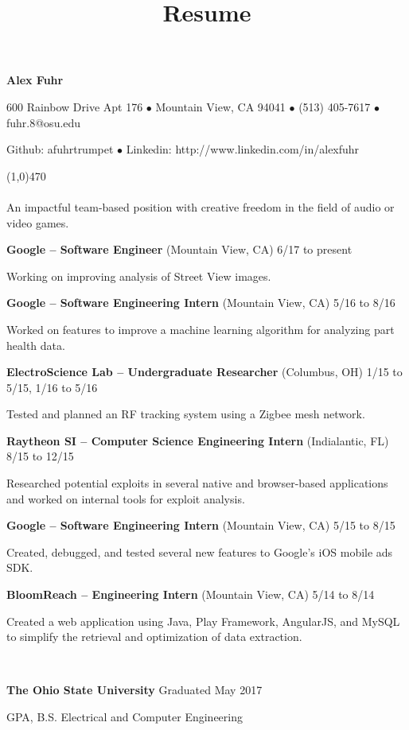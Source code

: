 \documentclass[10pt]{article}
\title{Resume}
\begin{document}
\centerline{{\LARGE \bf Alex Fuhr}}
\centerline{600 Rainbow Drive Apt 176 $\bullet$ Mountain View, CA 94041 $\bullet$ (513) 405-7617 $\bullet$ fuhr.8@osu.edu}
\centerline{Github: afuhrtrumpet $\bullet$ Linkedin: http://www.linkedin.com/in/alexfuhr}
\noindent
\line(1,0){470}\\

\\
\smallskip
\noindent
An impactful team-based position with creative freedom in the field of audio or video games.
\medskip

\smallskip

\centerline{{\large {\bf Google -- Software Engineer} (Mountain View, CA) \hfill 6/17 to present}}
\noindent
Working on improving analysis of Street View images.
\smallskip

\centerline{{\large {\bf Google -- Software Engineering Intern} (Mountain View, CA) \hfill 5/16 to 8/16}}
\noindent
Worked on features to improve a machine learning algorithm for analyzing part health data.
\smallskip

\centerline{{\large {\bf ElectroScience Lab -- Undergraduate Researcher} (Columbus, OH) \hfill 1/15 to 5/15, 1/16 to 5/16}}
\noindent
Tested and planned an RF tracking system using a Zigbee mesh network.
\smallskip

\centerline{{\large {\bf Raytheon SI -- Computer Science Engineering Intern} (Indialantic, FL) \hfill 8/15 to 12/15}}
\noindent
Researched potential exploits in several native and browser-based applications and worked on internal tools for exploit analysis.
\smallskip

\centerline{{\large {\bf Google -- Software Engineering Intern} (Mountain View, CA) \hfill 5/15 to 8/15}}
\noindent
Created, debugged, and tested several new features to Google's iOS mobile ads SDK.
\smallskip

\centerline{{\large {\bf BloomReach -- Engineering Intern} (Mountain View, CA) \hfill 5/14 to 8/14}}
\noindent
Created a web application using Java, Play Framework, AngularJS, and MySQL to simplify the retrieval and optimization of data extraction.
\medskip

\\
\smallskip
\centerline{{\large {\bf The Ohio State University} \hfill Graduated May 2017}}
 GPA, B.S. Electrical and Computer Engineering
\medskip
\end{document}
